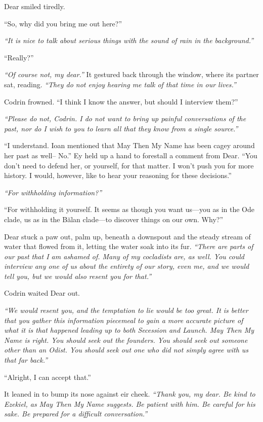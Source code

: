 Dear smiled tiredly.

``So, why did you bring me out here?''

\emph{``It is nice to talk about serious things with the sound of rain in the background.''}

``Really?''

\emph{``Of course not, my dear.''} It gestured back through the window, where its partner sat, reading. \emph{``They do not enjoy hearing me talk of that time in our lives.''}

Codrin frowned. ``I think I know the answer, but should I interview them?''

\emph{``Please do not, Codrin. I do not want to bring up painful conversations of the past, nor do I wish to you to learn all that they know from a single source.''}

``I understand. Ioan mentioned that May Then My Name has been cagey around her past as well-- No.'' Ey held up a hand to forestall a comment from Dear. ``You don't need to defend her, or yourself, for that matter. I won't push you for more history. I would, however, like to hear your reasoning for these decisions.''

\emph{``For withholding information?''}

``For withholding it yourself. It seems as though you want us---you as in the Ode clade, us as in the Bălan clade---to discover things on our own. Why?''

Dear stuck a paw out, palm up, beneath a downspout and the steady stream of water that flowed from it, letting the water soak into its fur. \emph{``There are parts of our past that I am ashamed of. Many of my cocladists are, as well. You could interview any one of us about the entirety of our story, even me, and we would tell you, but we would also resent you for that.''}

Codrin waited Dear out.

\emph{``We would resent you, and the temptation to lie would be too great. It is better that you gather this information piecemeal to gain a more accurate picture of what it is that happened leading up to both Secession and Launch. May Then My Name is right. You should seek out the founders. You should seek out someone other than an Odist. You should seek out one who did not simply agree with us that far back.''}

``Alright, I can accept that.''

It leaned in to bump its nose against eir cheek. \emph{``Thank you, my dear. Be kind to Ezekiel, as May Then My Name suggests. Be patient with him. Be careful for his sake. Be prepared for a difficult conversation.''}

